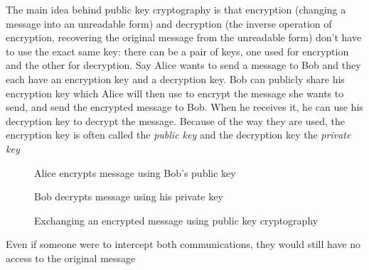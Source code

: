\documentclass[12pt, titlepage]{article}
\begin{document}
The main idea behind public key cryptography is that encryption (changing a message into an
unreadable form) and decryption (the inverse operation of encryption, recovering the
original message from the unreadable form) don't have to use the exact same key: there can
be a pair of keys, one used for encryption and the other for decryption. Say Alice wants to
send a message to Bob and they each have an encryption key and a decryption key. Bob can
publicly share his encryption key which Alice will then use to encrypt the message she wants
to send, and send the encrypted message to Bob. When he receives it, he can use his
decryption key to decrypt the message. Because of the way they are used, the encryption key
is often called the \emph{public key} and the decryption key the \emph{private key}
%
\begin{figure}[h!] 
    \centering
    \label{fig:message_exchange}
    
    \vspace{1cm}
    Alice encrypts message using Bob's public key
    \vspace{1cm}


    \vspace{1cm}
    Bob decrypts message using his private key
    \vspace{1cm}

    \caption{Exchanging an encrypted message using public key cryptography}
\end{figure}
%

Even if someone were to intercept both communications, they would still have no access to
the original message
\end{document}
